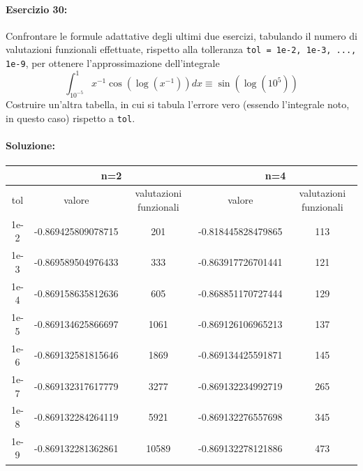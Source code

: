 \documentclass[12pt]{article}
\begin{document}
\newpage
\paragraph{Esercizio 30:}
Confrontare le formule adattative degli ultimi due esercizi, tabulando il numero
di valutazioni funzionali effettuate, rispetto alla tolleranza \texttt{tol = 1e-2, 1e-3, ..., 1e-9}, per
ottenere l’approssimazione dell’integrale \\
$$\int_{10^{-5}}^{1}x^{-1}\cos(\log(x^{-1}))dx\equiv\sin(\log(10^{5}))$$
Costruire un’altra tabella, in cui si tabula l’errore vero (essendo l’integrale noto, in questo caso)
rispetto a \texttt{tol}.
\paragraph{Soluzione:}
\begin{center}
\begin{tabular}{||c || c | c | c | c ||} 
    \hline
    \hline
     &  \multicolumn{2}{|c|}{n=2} & \multicolumn{2}{|c|}{n=4}\\
     \hline

    tol & valore & valutazioni funzionali & valore & valutazioni funzionali \\
    \hline
    1e-2 & -0.869425809078715 & 201 & -0.818445828479865 & 113 \\
    \hline
    1e-3 & -0.869589504976433 & 333 & -0.863917726701441 & 121 \\
    \hline
    1e-4 & -0.869158635812636 & 605 & -0.868851170727444 & 129 \\
    \hline
    1e-5 & -0.869134625866697 & 1061 & -0.869126106965213 & 137 \\
    \hline
    1e-6 & -0.869132581815646 & 1869 & -0.869134425591871 & 145 \\
    \hline
    1e-7 & -0.869132317617779 & 3277 & -0.869132234992719 & 265 \\
    \hline
    1e-8 & -0.869132284264119 & 5921 & -0.869132276557698 & 345 \\
    \hline
    1e-9 & -0.869132281362861 & 10589 & -0.869132278121886 & 473 \\
    \hline
    \hline
\end{tabular}
\end{center}
\end{document}
